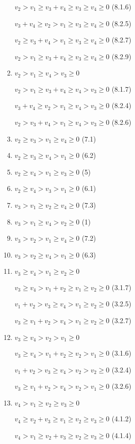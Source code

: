 \documentclass{article}
\begin{document}
\begin{enumerate}
    $v_2>v_1\geq{v_3+v_4}\geq{v_3}\geq{v_4}\geq{0}$ (8.1.6)

    $v_3+v_4\geq{v_2}>v_1\geq{v_3}\geq{v_4}\geq{0}$ (8.2.5)

    $v_2\geq{v_3+v_4}>v_1\geq{v_3}\geq{v_4}\geq{0}$ (8.2.7)

    $v_2>v_1\geq{v_3+v_4}\geq{v_3}\geq{v_4}\geq{0}$ (8.2.9)

    \item $v_2>v_1\geq{v_4}>v_3\geq{0}$

    $v_2>v_1\geq{v_3+v_4}\geq{v_4}>v_3\geq{0}$ (8.1.7)

    $v_3+v_4\geq{v_2}>v_1\geq{v_4}>v_3\geq{0}$ (8.2.4)

    $v_2>v_3+v_4>v_1\geq{v_4}>v_3\geq{0}$ (8.2.6)

    \item $v_2\geq{v_3}>v_1\geq{v_4}\geq{0}$ (7.1)
    \item $v_2\geq{v_3}\geq{v_4}>v_1\geq{0}$ (6.2)
    \item $v_2\geq{v_4}>v_1\geq{v_3}\geq{0}$ (5)
    \item $v_2\geq{v_4}>v_3>v_1\geq{0}$ (6.1)
    \item $v_3>v_1\geq{v_2}\geq{v_4}\geq{0}$ (7.3)
    \item $v_3>v_1\geq{v_4}>v_2\geq{0}$ (1)
    \item $v_3>v_2>v_1\geq{v_4}\geq{0}$ (7.2)
    \item $v_3>v_2\geq{v_4}>v_1\geq{0}$ (6.3)
    \item $v_3\geq{v_4}>v_1\geq{v_2}\geq{0}$

    $v_3\geq{v_4}>v_1+v_2\geq{v_1}\geq{v_2}\geq{0}$ (3.1.7)

    $v_1+v_2>v_3\geq{v_4}>v_1\geq{v_2}\geq{0}$ (3.2.5)

    $v_3\geq{v_1+v_2}>v_4>v_1\geq{v_2}\geq{0}$ (3.2.7)

    \item $v_3\geq{v_4}>v_2>v_1\geq{0}$

    $v_3\geq{v_4}>v_1+v_2\geq{v_2}>v_1\geq{0}$ (3.1.6)

    $v_1+v_2>v_3\geq{v_4}>v_2>v_2\geq{0}$ (3.2.4)

    $v_3\geq{v_1+v_2}>v_4>v_2>v_1\geq{0}$ (3.2.6)

    \item $v_4>v_1\geq{v_2}\geq{v_3}\geq{0}$

    $v_4\geq{v_2+v_3}\geq{v_1}\geq{v_2}\geq{v_3}\geq{0}$ (4.1.2)
    
    $v_4>v_1\geq{v_2+v_3}\geq{v_2}\geq{v_3}\geq{0}$ (4.1.4)
    

\end{enumerate}
\end{document}
